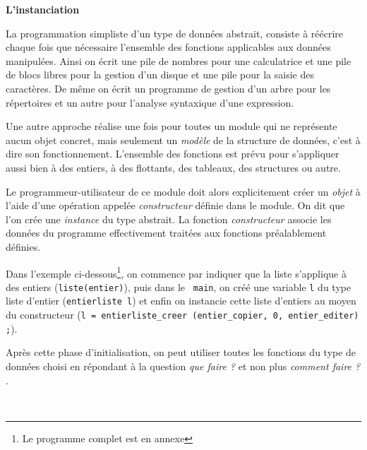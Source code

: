\centerline{\Large\bf L'instanciation}
 
 \noindent\hrulefill  
\begin{multicols}{2}

La programmation simpliste d'un type de donn\'ees abstrait, consiste \`a 
r\'e\'ecrire chaque fois que n\'ecessaire l'ensemble des fonctions applicables
aux donn\'ees manipul\'ees.  Ainsi on \'ecrit une pile
de nombres pour une calculatrice et une pile de blocs libres pour la gestion
d'un disque et une pile pour la saisie des caract\`eres. De m\^eme on \'ecrit un
programme de gestion d'un arbre pour les r\'epertoires et un autre pour l'analyse
syntaxique d'une expression. 


Une autre approche r\'ealise une fois pour toutes un module qui ne repr\'esente
aucun objet concret, mais seulement un {\it mod\`ele} de la structure de
donn\'ees, c'est \`a dire son fonctionnement. L'ensemble des fonctions est pr\'evu
pour s'appliquer aussi bien \`a des entiers, \`a des flottants, des tableaux,
des structures ou autre.


Le programmeur-utilisateur de ce module doit alors explicitement cr\'eer un {\it
objet} \`a l'aide d'une op\'eration appel\'ee {\it constructeur} d\'efinie dans le
module. On dit que l'on cr\'ee une {\it instance} du type abstrait. 
La fonction {\it constructeur} associe les donn\'ees du programme effectivement
trait\'ees aux fonctions pr\'ealablement d\'efinies. 

Dans l'exemple ci-dessous\footnote{Le programme complet est en annexe},
on commence par indiquer que
la liste s'applique \`a des entiers ({\tt liste(entier)}), puis dans le {\tt
main}, on cr\'e\'e une variable {\tt l} du type liste d'entier ({\tt entierliste l})
et enfin on instancie cette liste d'entiers au moyen du constructeur ({\tt l =
entierliste\_creer (entier\_copier, 0, entier\_editer) ;}).

Apr\`es cette phase d'initialisation, on peut utiliser toutes les fonctions 
du type de donn\'ees choisi en r\'epondant \`a la question {\it que faire ?}
et non plus {\it comment faire ? }.

\vspace{1cm}

{\small
{}}

\newpage
~

\end{multicols}
